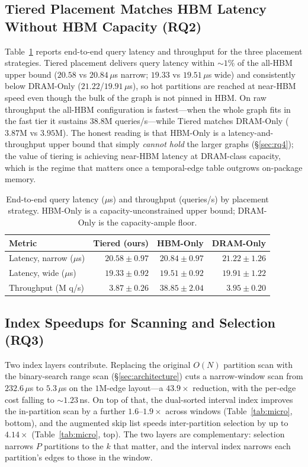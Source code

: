 \documentclass[10pt]{article}
\theoremstyle{definition}
\begin{document}
\subsection{Tiered Placement Matches HBM Latency Without HBM Capacity (RQ2)}
\label{sec:rq2}

Table~\ref{tab:e2e} reports end-to-end query latency and throughput for the three
placement strategies. Tiered placement delivers query latency within ${\sim}1\%$ of
the all-HBM upper bound ($20.58$ vs $20.84\,\mu$s narrow; $19.33$ vs $19.51\,\mu$s
wide) and consistently below DRAM-Only ($21.22$/$19.91\,\mu$s), so hot partitions
are reached at near-HBM speed even though the bulk of the graph is not pinned in
HBM. On raw throughput the all-HBM configuration is fastest---when the whole graph
fits in the fast tier it sustains $38.8$M queries/s---while Tiered matches DRAM-Only
($3.87$M vs $3.95$M). The honest reading is that HBM-Only is a latency-and-throughput
upper bound that simply \emph{cannot hold} the larger graphs (\S\ref{sec:rq4}); the
value of tiering is achieving near-HBM latency at DRAM-class capacity, which is the
regime that matters once a temporal-edge table outgrows on-package memory.

\begin{table}[t]
\centering
\caption{End-to-end query latency ($\mu$s) and throughput (queries/s) by placement
strategy. HBM-Only is a capacity-unconstrained upper bound; DRAM-Only is the
capacity-ample floor.}
\label{tab:e2e}
\begin{tabular}{lrrr}
\toprule
Metric & Tiered (ours) & HBM-Only & DRAM-Only \\
\midrule
Latency, narrow ($\mu$s) & $20.58\pm0.97$ & $20.84\pm0.97$ & $21.22\pm1.26$ \\
Latency, wide ($\mu$s)   & $19.33\pm0.92$ & $19.51\pm0.92$ & $19.91\pm1.22$ \\
Throughput (M q/s)       & $3.87\pm0.26$  & $38.85\pm2.04$ & $3.95\pm0.20$ \\
\bottomrule
\end{tabular}
\end{table}

\subsection{Index Speedups for Scanning and Selection (RQ3)}
\label{sec:rq3}

Two index layers contribute. Replacing the original $O(N)$ partition scan with the
binary-search range scan (\S\ref{sec:architecture}) cuts a narrow-window scan from
$232.6\,\mu$s to $5.3\,\mu$s on the $1$M-edge layout---a $\mathbf{43.9\times}$
reduction, with the per-edge cost falling to ${\sim}1.23$\,ns. On top of that, the
dual-sorted interval index improves the in-partition scan by a further
$1.6$--$1.9\times$ across windows (Table~\ref{tab:micro}, bottom), and the augmented
skip list speeds inter-partition selection by up to $4.14\times$
(Table~\ref{tab:micro}, top). The two layers are complementary: selection narrows
$P$ partitions to the $k$ that matter, and the interval index narrows each
partition's edges to those in the window.
\end{document}
